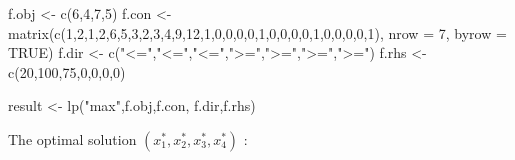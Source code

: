 \documentclass[
]{article}
\newenvironment{Shaded}{\begin{snugshade}}{\end{snugshade}}
\newcommand{\AttributeTok}[1]{\textcolor[rgb]{0.77,0.63,0.00}{#1}}
\newcommand{\ConstantTok}[1]{\textcolor[rgb]{0.00,0.00,0.00}{#1}}
\newcommand{\DecValTok}[1]{\textcolor[rgb]{0.00,0.00,0.81}{#1}}
\newcommand{\FunctionTok}[1]{\textcolor[rgb]{0.00,0.00,0.00}{#1}}
\newcommand{\NormalTok}[1]{#1}
\newcommand{\OtherTok}[1]{\textcolor[rgb]{0.56,0.35,0.01}{#1}}
\newcommand{\SpecialCharTok}[1]{\textcolor[rgb]{0.00,0.00,0.00}{#1}}
\newcommand{\StringTok}[1]{\textcolor[rgb]{0.31,0.60,0.02}{#1}}
\begin{document}
\begin{Shaded}
\begin{Highlighting}[]
\NormalTok{f.obj }\OtherTok{\textless{}{-}} \FunctionTok{c}\NormalTok{(}\DecValTok{6}\NormalTok{,}\DecValTok{4}\NormalTok{,}\DecValTok{7}\NormalTok{,}\DecValTok{5}\NormalTok{)}
\NormalTok{f.con }\OtherTok{\textless{}{-}} \FunctionTok{matrix}\NormalTok{(}\FunctionTok{c}\NormalTok{(}\DecValTok{1}\NormalTok{,}\DecValTok{2}\NormalTok{,}\DecValTok{1}\NormalTok{,}\DecValTok{2}\NormalTok{,}\DecValTok{6}\NormalTok{,}\DecValTok{5}\NormalTok{,}\DecValTok{3}\NormalTok{,}\DecValTok{2}\NormalTok{,}\DecValTok{3}\NormalTok{,}\DecValTok{4}\NormalTok{,}\DecValTok{9}\NormalTok{,}\DecValTok{12}\NormalTok{,}\DecValTok{1}\NormalTok{,}\DecValTok{0}\NormalTok{,}\DecValTok{0}\NormalTok{,}\DecValTok{0}\NormalTok{,}\DecValTok{0}\NormalTok{,}\DecValTok{1}\NormalTok{,}\DecValTok{0}\NormalTok{,}\DecValTok{0}\NormalTok{,}\DecValTok{0}\NormalTok{,}\DecValTok{0}\NormalTok{,}\DecValTok{1}\NormalTok{,}\DecValTok{0}\NormalTok{,}\DecValTok{0}\NormalTok{,}\DecValTok{0}\NormalTok{,}\DecValTok{0}\NormalTok{,}\DecValTok{1}\NormalTok{), }\AttributeTok{nrow =} \DecValTok{7}\NormalTok{, }\AttributeTok{byrow =} \ConstantTok{TRUE}\NormalTok{)}
\NormalTok{f.dir }\OtherTok{\textless{}{-}} \FunctionTok{c}\NormalTok{(}\StringTok{"\textless{}="}\NormalTok{,}\StringTok{"\textless{}="}\NormalTok{,}\StringTok{"\textless{}="}\NormalTok{,}\StringTok{"\textgreater{}="}\NormalTok{,}\StringTok{"\textgreater{}="}\NormalTok{,}\StringTok{"\textgreater{}="}\NormalTok{,}\StringTok{"\textgreater{}="}\NormalTok{)}
\NormalTok{f.rhs }\OtherTok{\textless{}{-}} \FunctionTok{c}\NormalTok{(}\DecValTok{20}\NormalTok{,}\DecValTok{100}\NormalTok{,}\DecValTok{75}\NormalTok{,}\DecValTok{0}\NormalTok{,}\DecValTok{0}\NormalTok{,}\DecValTok{0}\NormalTok{,}\DecValTok{0}\NormalTok{)}

\NormalTok{result }\OtherTok{\textless{}{-}} \FunctionTok{lp}\NormalTok{(}\StringTok{"max"}\NormalTok{,f.obj,f.con, f.dir,f.rhs)}
\end{Highlighting}
\end{Shaded}

The optimal solution \((x_1^*, x_2^*, x_3^*, x_4^*)\) :

\begin{Shaded}
\end{Shaded}
\end{document}
